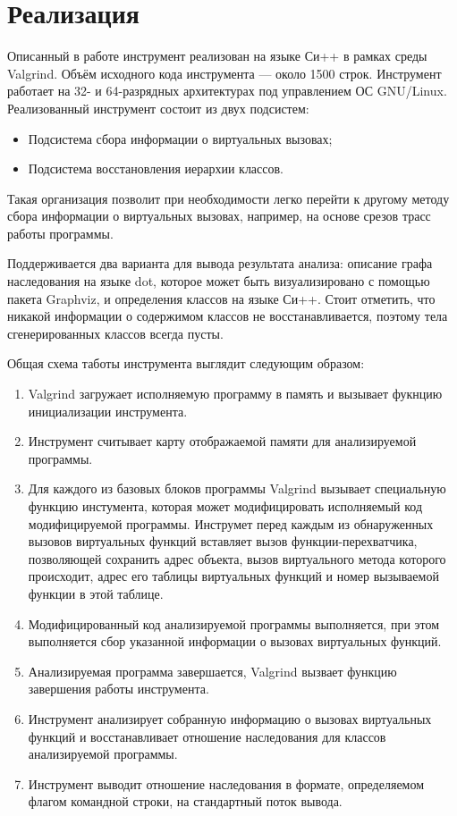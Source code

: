 \documentclass[a4paper,12pt,russian]{article}
\newcommand{\code}[1]{\textsf{#1}}
\begin{document}
\newpage
\section{Реализация}
Описанный в работе инструмент реализован на языке Си++ в рамках среды \code{Valgrind}. Объём исходного кода инструмента --- около 1500 строк.
Инструмент работает на 32- и 64-разрядных архитектурах под управлением ОС \code{GNU/Linux}.
Реализованный инструмент состоит из двух подсистем:
\begin{itemize}
    \item Подсистема сбора информации о виртуальных вызовах;
    \item Подсистема восстановления иерархии классов.
\end{itemize}
Такая организация позволит при необходимости легко перейти к другому методу сбора информации о виртуальных вызовах, например, на основе срезов трасс работы программы.

Поддерживается два варианта для вывода результата анализа: описание графа наследования на языке \code{dot}, которое может быть визуализировано с помощью пакета \code{Graphviz}, и определения классов на языке Си++.
Стоит отметить, что никакой информации о содержимом классов не восстанавливается, поэтому тела сгенерированных классов всегда пусты.

Общая схема таботы инструмента выглядит следующим образом:
\begin{enumerate}
    \item \code{Valgrind} загружает исполняемую программу в память и вызывает фукнцию инициализации инструмента.
    \item Инструмент считывает карту отображаемой памяти для анализируемой программы.
    \item Для каждого из базовых блоков программы \code{Valgrind} вызывает специальную функцию инстумента, которая может модифицировать исполняемый код модифицируемой программы. Инструмет перед каждым из обнаруженных вызовов виртуальных функций вставляет вызов функции-перехватчика, позволяющей сохранить адрес объекта, вызов виртуального метода которого происходит, адрес его таблицы виртуальных функций и номер вызываемой функции в этой таблице.
    \item Модифицированный код анализируемой программы выполняется, при этом выполняется сбор указанной информации о вызовах виртуальных функций.
    \item Анализируемая программа завершается, \code{Valgrind} вызвает функцию завершения работы инструмента.
    \item Инструмент анализирует собранную информацию о вызовах виртуальных функций и восстанавливает отношение наследования для классов анализируемой программы.
    \item Инструмент выводит отношение наследования в формате, определяемом флагом командной строки, на стандартный поток вывода.
\end{enumerate}
\end{document}
